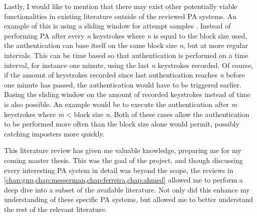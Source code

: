 \documentclass[informationsecurity]{gucmasterproject}
\begin{document}
Lastly, I would like to mention that there may exist other potentially viable functionalities in existing literature outside of the reviewed PA systems.
An example of this is using a sliding window for attempt samples \cite{sliding}.
Instead of performing PA after every \textit{n} keystrokes where \textit{n} is equal to the block size used, the authentication can base itself on the same block size \textit{n}, but at more regular intervals.
This can be time based so that authentication is performed on a time interval, for instance one minute, using the last \textit{n} keystrokes recorded.
Of course, if the amount of keystrokes recorded since last authentication reaches \textit{n} before one minute has passed, the authentication would have to be triggered earlier.
Basing the sliding window on the amount of recorded keystrokes instead of time is also possible.
An example would be to execute the authentication after \textit{m} keystrokes where \textit{m} < block size \textit{n}.
Both of these cases allow the authentication to be performed more often than the block size alone would permit, possibly catching imposters more quickly.

This literature review has given me valuable knowledge, preparing me for my coming master thesis. This was the goal of the project, and though discussing every interesting PA system in detail was beyond the scope, the reviews in \cref{chap:gnp,chap:messerman,chap:ferreira,chap:ahmed} allowed me to perform a deep dive into a subset of the available literature.
Not only did this enhance my understanding of these specific PA systems, but allowed me to better understand the rest of the relevant literature.









%

\end{document}
